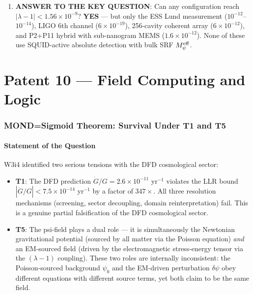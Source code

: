 \documentclass[11pt]{article}
\theoremstyle{definition}
\theoremstyle{remark}
\newcommand{\lam}{\lambda}
\newcommand{\Meff}{M_\psi^{\rm eff}}
\newcommand{\ee}[1]{\times 10^{#1}}
\begin{document}
\begin{tcolorbox}[colback=red!5!white, colframe=red!50!black,
  title=CRITICAL W3i5 RESULTS --- READ FIRST]
\begin{enumerate}[nosep]
\item \textbf{ANSWER TO THE KEY QUESTION}: Can any configuration reach
  $|\lam-1| < 1.56\ee{-9}$? \textbf{YES} --- but only the ESS Lund
  measurement ($10^{-12}$--$10^{-14}$), LIGO 6th channel ($6\ee{-19}$),
  256-cavity coherent array ($6\ee{-12}$), and P2+P11 hybrid with
  sub-nanogram MEMS ($1.6\ee{-12}$). None of these use SQUID-active
  absolute detection with bulk SRF $\Meff$.
\end{enumerate}
\end{tcolorbox}


\part{Patent 10 --- Field Computing and Logic}

\section{MOND=Sigmoid Theorem: Survival Under T1 and T5}
\label{sec:mond_sigmoid_t1t5}

\subsection{Statement of the Question}

W3i4 identified two serious tensions with the DFD cosmological sector:
\begin{itemize}
\item \textbf{T1}: The DFD prediction $\dot{G}/G = 2.6\ee{-11}$ yr$^{-1}$
  violates the LLR bound $|\dot{G}/G| < 7.5\ee{-14}$ yr$^{-1}$ by a
  factor of $347\times$. All three resolution mechanisms (screening,
  sector decoupling, domain reinterpretation) fail. This is a genuine
  partial falsification of the DFD cosmological sector.

\item \textbf{T5}: The psi-field plays a dual role --- it is simultaneously
  the Newtonian gravitational potential (sourced by all matter via the
  Poisson equation) \emph{and} an EM-sourced field (driven by the
  electromagnetic stress-energy tensor via the $(\lam-1)$ coupling). These
  two roles are internally inconsistent: the Poisson-sourced background
  $\psi_0$ and the EM-driven perturbation $\delta\psi$ obey different
  equations with different source terms, yet both claim to be the same
  field.
\end{itemize}
\end{document}
